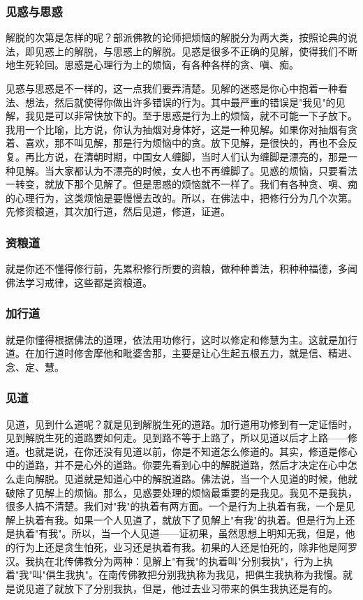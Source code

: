 \documentclass{book}
\begin{document}
\subsubsection{见惑与思惑}

解脱的次第是怎样的呢？部派佛教的论师把烦恼的解脱分为两大类，按照论典的说法，即见惑上的解脱，与思惑上的解脱。见惑是很多不正确的见解，使得我们不断地生死轮回。思惑是心理行为上的烦恼，有各种各样的贪、嗔、痴。

见惑与思惑是不一样的，这一点我们要弄清楚。见解的迷惑是你心中抱着一种看法、想法，然后就使得你做出许多错误的行为。其中最严重的错误是"我见"的见解，我见是可以非常快放下的。至于思惑是行为上的烦恼，就不可能一下子放下。我用一个比喻，比方说，你认为抽烟对身体好，这是一种见解。如果你对抽烟有贪着、喜欢，那不叫见解，那是行为烦恼中的贪。放下见解，是很快的，再也不会反复。再比方说，在清朝时期，中国女人缠脚，当时人们认为缠脚是漂亮的，那是一种见解。当大家都认为不漂亮的时候，女人也不再缠脚了。见惑的烦恼，只要看法一转变，就放下那个见解了。但是思惑的烦恼就不一样了。我们有各种贪、嗔、痴的心理行为，这类烦恼是要慢慢去改的。所以，在佛法中，把修行分为几个次第。先修资粮道，其次加行道，然后见道，修道，证道。

\subsubsection{资粮道}

就是你还不懂得修行前，先累积修行所要的资粮，做种种善法，积种种福德，多闻佛法学习戒律，这些都是资粮道。

\subsubsection{加行道}

就是你懂得根据佛法的道理，依法用功修行，这时以修定和修慧为主。这就是加行道。在加行道时修舍摩他和毗婆舍那，主要是让心生起五根五力，就是信、精进、念、定、慧。

\subsubsection{见道}

见道，见到什么道呢？就是见到解脱生死的道路。加行道用功修到有一定证悟时，见到解脱生死的道路要如何走。见到路不等于上路了，所以见道以后才上路——修道。也就是说，在你还没有见道以前，你是不知道怎么修道的。其实，修道是修心中的道路，并不是心外的道路。你要先看到心中的解脱道路，然后才决定在心中怎么走向解脱。见道就是知道心中的解脱道路。佛法说，当一个人见道的时候，他就破除了见解上的烦恼。那么，见惑要处理的烦恼最重要的是我见。我见不是我执，很多人搞不清楚。我们对"我"的执着有两方面。一个是行为上执着有我，一个是见解上执着有我。如果一个人见道了，就放下了见解上"有我"的执着。但是行为上还是执着"有我"。所以，当一个人见道——证初果，虽然思想上明知无我，但是，他的行为上还是贪生怕死，业习还是执着有我。初果的人还是怕死的，除非他是阿罗汉。我执在北传佛教分为两种：见解上"有我"的执着叫"分别我执"，行为上执着"我"叫"俱生我执"。在南传佛教把分别我执称为我见，把俱生我执称为我慢。就是说见道了就放下了分别我执，但是，他过去业习带来的俱生我执还是有的。
\end{document}
